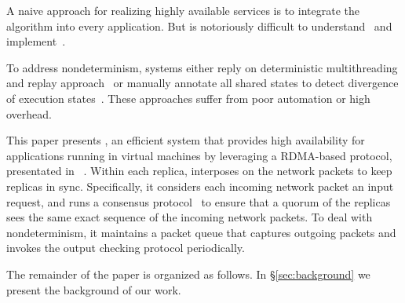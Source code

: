 A naive approach for realizing highly available services is to integrate the \paxos algorithm 
into every application. But \paxos is notoriously difficult to understand~\cite{raft:usenix14} 
and implement~\cite{paxos:practical}.

To address nondeterminism, \smr systems either reply on deterministic multithreading and replay 
approach~\cite{rex:eurosys14} or manually annotate all shared states to detect divergence of execution 
states~\cite{eve:osdi12}. These approaches suffer from poor automation or high overhead.

This paper presents \xxx, an efficient \smr system that provides high availability for applications 
running in virtual machines by leveraging a RDMA-based \paxos protocol, presentated 
in \protocol~\cite{dare:hpdc15}. Within each replica, \xxx interposes on the network packets to keep 
replicas in sync. Specifically, it considers each incoming network packet an input request, and runs 
a \paxos consensus protocol~\cite{paxos:practical} to ensure that a quorum of the replicas sees the 
same exact sequence of the incoming network packets. To deal with nondeterminism, it maintains a packet 
queue that captures outgoing packets and invokes the output checking protocol periodically.

The remainder of the paper is organized as follows. In \S\ref{sec:background} we present the background 
of our work.
